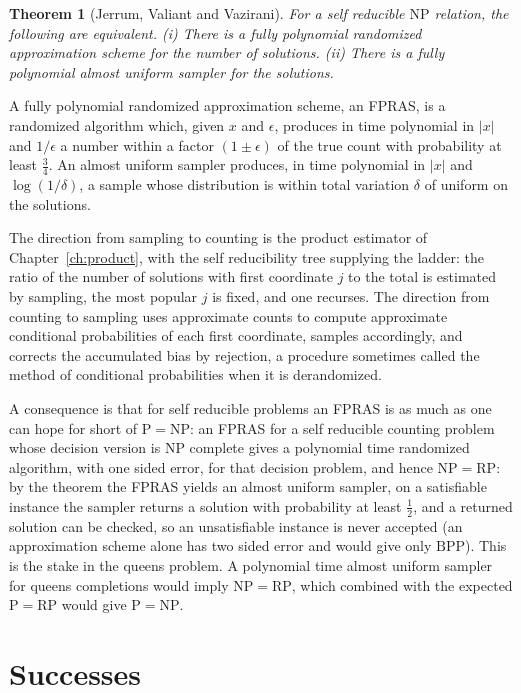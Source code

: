 \documentclass[11pt,twoside,openany]{book}
\theoremstyle{plain}
\newtheorem{theorem}{Theorem}[chapter]
\theoremstyle{definition}
\theoremstyle{remark}
\newcommand{\RP}{\mathrm{RP}}
\newcommand{\BPP}{\mathrm{BPP}}
\newcommand{\NP}{\mathrm{NP}}
\newcommand{\Pc}{\mathrm{P}}
\begin{document}
\begin{theorem}[Jerrum, Valiant and Vazirani]
For a self reducible $\NP$ relation, the following are equivalent. (i) There is a fully polynomial randomized approximation scheme for the number of solutions. (ii) There is a fully polynomial almost uniform sampler for the solutions.
\end{theorem}

A fully polynomial randomized approximation scheme, an FPRAS, is a randomized algorithm which, given $x$ and $\epsilon$, produces in time polynomial in $|x|$ and $1/\epsilon$ a number within a factor $(1 \pm \epsilon)$ of the true count with probability at least $\tfrac34$. An almost uniform sampler produces, in time polynomial in $|x|$ and $\log(1/\delta)$, a sample whose distribution is within total variation $\delta$ of uniform on the solutions.

The direction from sampling to counting is the product estimator of Chapter~\ref{ch:product}, with the self reducibility tree supplying the ladder: the ratio of the number of solutions with first coordinate $j$ to the total is estimated by sampling, the most popular $j$ is fixed, and one recurses. The direction from counting to sampling uses approximate counts to compute approximate conditional probabilities of each first coordinate, samples accordingly, and corrects the accumulated bias by rejection, a procedure sometimes called the method of conditional probabilities when it is derandomized.

A consequence is that for self reducible problems an FPRAS is as much as one can hope for short of $\Pc = \NP$: an FPRAS for a self reducible counting problem whose decision version is $\NP$ complete gives a polynomial time randomized algorithm, with one sided error, for that decision problem, and hence $\NP = \RP$: by the theorem the FPRAS yields an almost uniform sampler, on a satisfiable instance the sampler returns a solution with probability at least $\tfrac12$, and a returned solution can be checked, so an unsatisfiable instance is never accepted (an approximation scheme alone has two sided error and would give only $\BPP$). This is the stake in the queens problem. A polynomial time almost uniform sampler for queens completions would imply $\NP = \RP$, which combined with the expected $\Pc = \RP$ would give $\Pc = \NP$.

\section{Successes}
\end{document}

